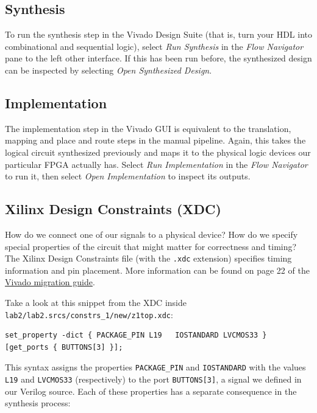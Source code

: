 \documentclass[11pt]{article}
\begin{document}
\subsection{Synthesis}
To run the synthesis step in the Vivado Design Suite (that is, turn your HDL into combinational and sequential logic), select \emph{Run Synthesis} in the \emph{Flow Navigator} pane to the left other interface. If this has been run before, the synthesized design can be inspected by selecting \emph{Open Synthesized Design}.

\subsection{Implementation}

The implementation step in the Vivado GUI is equivalent to the translation, mapping and place and route steps in the manual pipeline. Again, this takes the logical circuit synthesized previously and maps it to the physical logic devices our particular FPGA actually has. Select \emph{Run Implementation} in the \emph{Flow Navigator} to run it, then select \emph{Open Implementation} to inspect its outputs.

\subsection{Xilinx Design Constraints (XDC)}
How do we connect one of our signals to a physical device? How do we specify special properties of the circuit that might matter for correctness and timing?
The Xilinx Design Constraints file (with the \verb|.xdc| extension) specifies timing information and pin placement.
More information can be found on page 22 of the \href{https://www.xilinx.com/support/documentation/sw_manuals/xilinx2015_2/ug911-vivado-migration.pdf}{Vivado migration guide}.

Take a look at this snippet from the XDC inside \verb|lab2/lab2.srcs/constrs_1/new/z1top.xdc|:

\begin{verbatim}
set_property -dict { PACKAGE_PIN L19   IOSTANDARD LVCMOS33 } [get_ports { BUTTONS[3] }];
\end{verbatim}

This syntax assigns the properties \verb|PACKAGE_PIN| and \verb|IOSTANDARD| with the values \verb|L19| and \verb|LVCMOS33| (respectively) to the port \verb|BUTTONS[3]|, a signal we defined in our Verilog source. Each of these properties has a separate consequence in the synthesis process:
\end{document}
